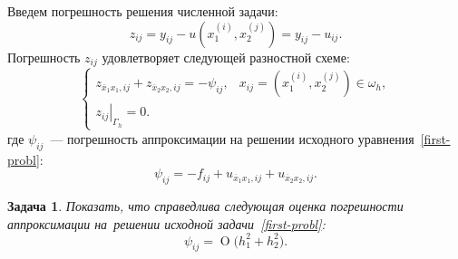 \documentclass[11pt,a4paper,twoside]{report}
\numberwithin{equation}{section}
\newtheorem*{problem}{Задача}
\theoremstyle{definition}
\theoremstyle{plain}
\newcommand{\bigO}[1]{\ensuremath{\operatorname{O}\bigl(#1\bigr)}}
\begin{document}
\vspace{0.5em}
\begin{figure}[H]
\centering
{}
\end{figure}

\noindent
Введем погрешность решения численной задачи:
%
$$
    z_{ij} = y_{ij} - u\left(x_1^{(i)}, x_2^{(j)}\right) = y_{ij} - u_{ij}.
$$
%
Погрешность $z_{ij}$ удовлетворяет следующей разностной схеме:
%
$$
    \begin{cases}
        z_{\overline{x}_1x_1,ij}+z_{\overline{x}_2x_2,ij}=-\psi_{ij}, &
            x_{ij} = \left(x_1^{(i)}, x_2^{(j)}\right) \in \omega_h,\\
        \left.z_{ij}\right\vert_{\Gamma_h} = 0. &
    \end{cases}
$$
%
где $\psi_{ij}$~— погрешность аппроксимации на решении
исходного уравнения~\eqref{first-probl}:
%
$$
    \psi_{ij} = -f_{ij} + u_{\overline{x}_1x_1,ij} + u_{\overline{x}_2x_2,ij}.
$$
%
%
\begin{problem}
    Показать, что справедлива следующая оценка погрешности аппроксимации
    на~решении исходной задачи~\eqref{first-probl}:
    $$
        \psi_{ij} = \bigO{h_1^2 + h_2^2}.
    $$
\end{problem}
%
%
\end{document}
